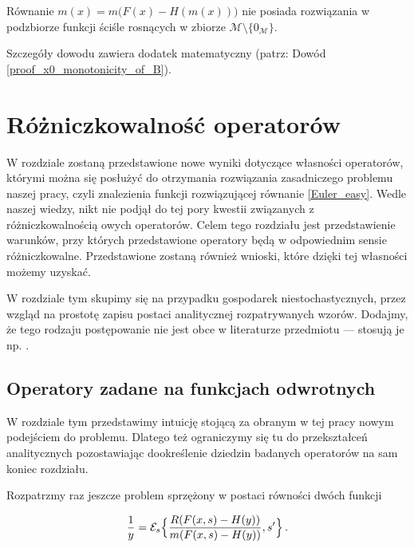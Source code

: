 \begin{lemat}\label{no_solution}
	Równanie $m(x) = m\big( F(x) - H(m(x)) \big)$ nie posiada rozwiązania w podzbiorze funkcji ściśle rosnących w zbiorze $\mathcal{M}\setminus\{ 0_{\mathcal{M}}\}$.
\end{lemat}

Szczegóły dowodu zawiera dodatek matematyczny (patrz: Dowód \ref{proof_x0_monotonicity_of_B}).




\chapter{Różniczkowalność operatorów}\label{chap_diff}

W rozdziale zostaną przedstawione nowe wyniki dotyczące własności operatorów, którymi można się posłużyć do otrzymania rozwiązania zasadniczego problemu naszej pracy, czyli znalezienia funkcji rozwiązującej równanie \ref{Euler_easy}. Wedle naszej wiedzy, nikt nie podjął do tej pory kwestii związanych z różniczkowalnością owych operatorów. Celem tego rozdziału jest przedstawienie warunków, przy których przedstawione operatory będą w odpowiednim sensie różniczkowalne. Przedstawione zostaną również wnioski, które dzięki tej własności możemy uzyskać. 

W rozdziale tym skupimy się na przypadku gospodarek niestochastycznych, przez wzgląd na prostotę zapisu postaci analitycznej rozpatrywanych wzorów. Dodajmy, że tego rodzaju postępowanie nie jest obce w literaturze przedmiotu --- stosują je np. \cite{Reffett}. 

\section{Operatory zadane na funkcjach odwrotnych}

W rozdziale tym przedstawimy intuicję stojącą za obranym w tej pracy nowym podejściem do problemu. Dlatego też ograniczymy się tu do przekształceń analitycznych pozostawiając dookreślenie dziedzin badanych operatorów na sam koniec rozdziału.

Rozpatrzmy raz jeszcze problem sprzężony w postaci równości dwóch funkcji

\begin{equation*}
\frac{1}{y} = \mathcal{E}_s \Bigl \{ \frac{R(F(x,s) - H(y))}{m(F(x,s) - H(y))}, s' \Bigl \}\,. 
\end{equation*}

